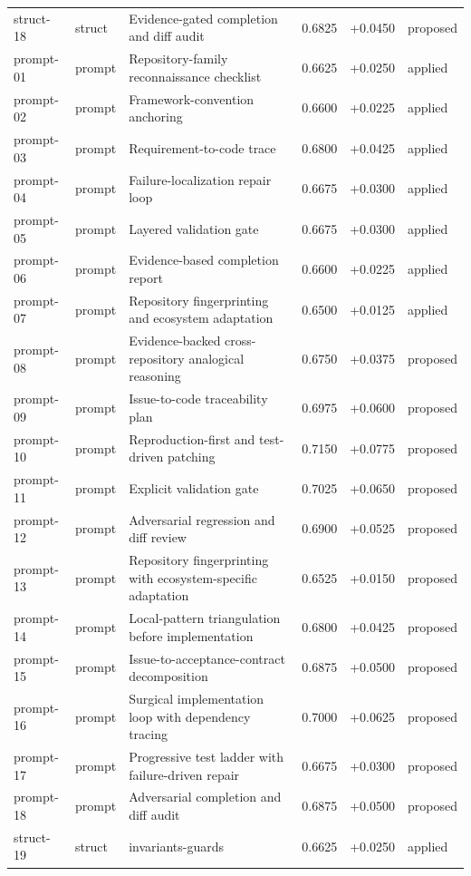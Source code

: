 \begin{center}
\begin{longtable}{llp{5.2cm}rrl}
struct-18 & struct & Evidence-gated completion and diff audit & 0.6825 & +0.0450 & proposed \\
prompt-01 & prompt & Repository-family reconnaissance checklist & 0.6625 & +0.0250 & applied \\
prompt-02 & prompt & Framework-convention anchoring & 0.6600 & +0.0225 & applied \\
prompt-03 & prompt & Requirement-to-code trace & 0.6800 & +0.0425 & applied \\
prompt-04 & prompt & Failure-localization repair loop & 0.6675 & +0.0300 & applied \\
prompt-05 & prompt & Layered validation gate & 0.6675 & +0.0300 & applied \\
prompt-06 & prompt & Evidence-based completion report & 0.6600 & +0.0225 & applied \\
prompt-07 & prompt & Repository fingerprinting and ecosystem adaptation & 0.6500 & +0.0125 & applied \\
prompt-08 & prompt & Evidence-backed cross-repository analogical reasoning & 0.6750 & +0.0375 & proposed \\
prompt-09 & prompt & Issue-to-code traceability plan & 0.6975 & +0.0600 & proposed \\
prompt-10 & prompt & Reproduction-first and test-driven patching & 0.7150 & +0.0775 & proposed \\
prompt-11 & prompt & Explicit validation gate & 0.7025 & +0.0650 & proposed \\
prompt-12 & prompt & Adversarial regression and diff review & 0.6900 & +0.0525 & proposed \\
prompt-13 & prompt & Repository fingerprinting with ecosystem-specific adaptation & 0.6525 & +0.0150 & proposed \\
prompt-14 & prompt & Local-pattern triangulation before implementation & 0.6800 & +0.0425 & proposed \\
prompt-15 & prompt & Issue-to-acceptance-contract decomposition & 0.6875 & +0.0500 & proposed \\
prompt-16 & prompt & Surgical implementation loop with dependency tracing & 0.7000 & +0.0625 & proposed \\
prompt-17 & prompt & Progressive test ladder with failure-driven repair & 0.6675 & +0.0300 & proposed \\
prompt-18 & prompt & Adversarial completion and diff audit & 0.6875 & +0.0500 & proposed \\
struct-19 & struct & invariants-guards & 0.6625 & +0.0250 & applied \\

\end{longtable}
\end{center}
